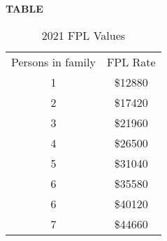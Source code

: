 \documentclass[12pt]{article}
\begin{document}
\begin{titlingpage}
\newpage
\textbf{TABLE}

\begin{table}[H]
    \centering
    \begin{tabular}{c|c}
        Persons in family & FPL Rate \\
        1 & \$12880 \\
        2 & \$17420 \\
        3 & \$21960 \\
        4 & \$26500 \\
        5 & \$31040 \\
        6 & \$35580 \\
        6 & \$40120 \\
        7 & \$44660 \\
    \end{tabular}
    \caption{2021 FPL Values}
    \label{tab:my_label}
\end{table}





\newpage
\printbibliography[heading=bibintoc,title={Bibliography}] 


\end{titlingpage}
\end{document}
